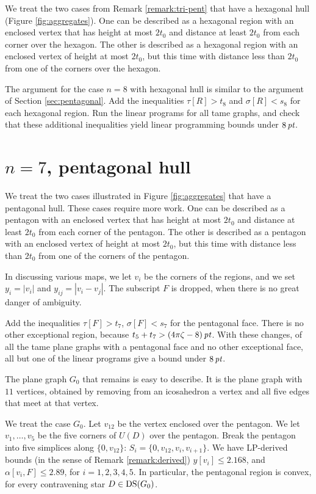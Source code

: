 We treat the two cases from Remark \ref{remark:tri-pent} that have a
hexagonal hull  (Figure \ref{fig:aggregates}). One can be described as a
hexagonal region with an enclosed vertex that has height at most $2t_0$
and distance at least $2t_0$ from each corner over the hexagon.  The
other is described as a hexagonal region with an enclosed vertex of
height at most $2t_0$, but this time with distance less than $2t_0$ from
one of the corners over the hexagon.

The argument for the case $n=8$ with hexagonal hull is similar to
the argument of Section \ref{sec:pentagonal}. Add the inequalities
$\tau[R]>t_8$ and $\sigma[R]<s_8$ for each hexagonal region. Run
the linear programs for all tame graphs, and check that these
additional inequalities yield linear programming bounds under
$8\,\hbox{\it pt}$.

\section{$n=7$, pentagonal hull} %
\label{sec:3.8}

We treat the two cases illustrated in Figure \ref{fig:aggregates}
that have a pentagonal hull. These cases require more work.  One
can be described as a pentagon with an enclosed vertex that has
height at most $2t_0$ and distance at least $2t_0$ from each
corner of the pentagon. The other is described as a pentagon with
an enclosed vertex of height at most $2t_0$, but this time with
distance less than $2t_0$ from one of the corners of the pentagon.

In discussing various maps, we let $v_i$ be the corners of the regions,
and we set $y_i = |v_i|$ and $y_{ij}= |v_i-v_j|$. The subscript $F$ is
dropped, when there is no great danger of ambiguity.

Add the inequalities $\tau[F]>t_7$, $\sigma[F]<s_7$ for the
pentagonal face. There is no other exceptional region, because
$t_5+t_7> (4\pi\zeta-8)\,\hbox{\it pt}$. With these changes, of all the tame plane
graphs with a pentagonal face and no other exceptional face, all
but one of the linear programs give a bound under $8\,\hbox{\it pt}$.

The plane graph $G_0$ that remains is easy to describe.  It is the
plane graph with $11$ vertices, obtained by removing from an
icosahedron a vertex and all five edges that meet at that vertex.

We treat the case $G_0$.   Let $v_{12}$ be the vertex enclosed
over the pentagon. We let $v_1,\ldots,v_5$ be the five corners of
$U(D)$ over the pentagon. Break the pentagon into five simplices
along $\{0,v_{12}\}$:  $S_i = \{0,v_{12},v_i,v_{i+1}\}$. We have
LP-derived bounds (in the sense of Remark \ref{remark:derived})
$y[v_i]\le2.168$, and $\alpha[v_i,F]\le2.89$, for $i=1,2,3,4,5$.
In particular, the pentagonal region is convex, for every
contravening star $D\in{\operatorname{DS}}(G_0)$.

